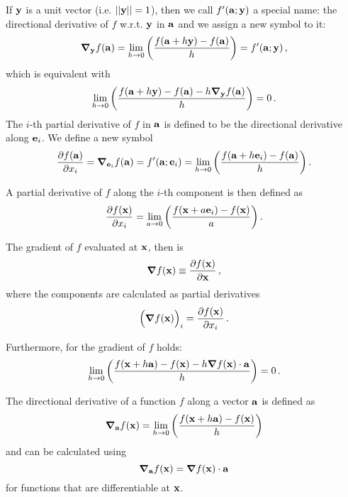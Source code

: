         If $\vb{y}$ is a unit vector (i.e. $||\vb{y}|| = 1$), then we call $f'(\vb{a};\vb{y})$ a special name: the directional derivative of $f$ w.r.t. $\vb{y}$ in $\vb{a}$ and we assign a new symbol to it:
        \begin{equation}
            \grad_{\vb{y}} f(\vb{a}) = \lim_{h \to 0} \qty( \frac{f(\vb{a} + h\vb{y}) - f(\vb{a})}{h} ) = f'(\vb{a};\vb{y}) \thinspace ,
        \end{equation}
        which is equivalent with
        \begin{equation}
            \lim_{h \to 0} \qty( \frac{f(\vb{a} + h \vb{y}) - f(\vb{a}) - h \grad_{\vb{y}} f(\vb{a})}{h} ) = 0 \thinspace .
        \end{equation}
        The $i$-th partial derivative of $f$ in $\vb{a}$ is defined to be the directional derivative along $\vb{e}_i$. We define a new symbol
        \begin{equation}
            \pdv{f(\vb{a})}{x_i} = \grad_{\vb{e}_i} f(\vb{a}) = f'(\vb{a};\vb{e}_i) = \lim_{h \to 0} \qty( \frac{f(\vb{a} + h\vb{e}_i) - f(\vb{a})}{h} ) \thinspace .
        \end{equation}


        A partial derivative of $f$ along the $i$-th component is then defined as
        \begin{equation}
            \pdv{f(\vb{x})}{x_i} = \lim_{a \to 0} \qty( \frac{f(\vb{x} + a \vb{e}_i) - f(\vb{x})}{a} ) \thinspace .
        \end{equation}

        The gradient of $f$ evaluated at $\vb{x}$, then is
        \begin{equation}
            \grad{f(\vb{x})} \equiv \pdv{f(\vb{x})}{\vb{x}} \thinspace ,
        \end{equation}
        where the components are calculated as partial derivatives
        \begin{equation}
            \Big( \grad{f(\vb{x})} \Big)_i = \pdv{f(\vb{x})}{x_i} \thinspace .
        \end{equation}

        Furthermore, for the gradient of $f$ holds:
        \begin{equation}
            \lim_{h \to 0} \qty( \frac{f(\vb{x} + h \vb{a}) - f(\vb{x}) - h \grad{f(\vb{x})} \cdot \vb{a}}{h} ) = 0 \thinspace .
        \end{equation}

        The directional derivative of a function $f$ along a vector $\vb{a}$ is defined as
        \begin{equation}
            \grad_{\vb{a}} f(\vb{x}) = \lim_{h \to 0} \qty( \frac{f(\vb{x} + h \vb{a}) - f(\vb{x})}{h} )
        \end{equation}
        and can be calculated using
        \begin{equation}
            \grad_{\vb{a}} f(\vb{x}) = \grad{f(\vb{x})} \cdot \vb{a}
        \end{equation}
        for functions that are differentiable at $\vb{x}$. \\

